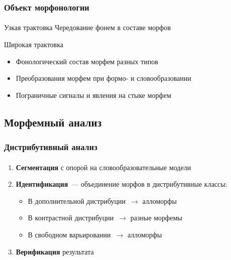 \begin{frame}
    \frametitle{Объект морфонологии}
    \framesubtitle{\autocite{les}}

    \begin{alertblock}{Узкая трактовка}
        Чередование фонем в составе морфов
    \end{alertblock}

    \begin{exampleblock}{Широкая трактовка}
        \begin{itemize}
            \item Фонологический состав морфем разных типов
            \item Преобразования морфем при формо- и словообразовании
            \item Пограничные сигналы и явления на стыке морфем
        \end{itemize}
    \end{exampleblock}
\end{frame}

\subsection{Морфемный анализ}


\begin{frame}
    \frametitle{Дистрибутивный анализ}
    \framesubtitle{\autocite[48--51]{apresyan:1966}}

    \begin{enumerate}
        \item \textbf{Сегментация} с опорой на словообразовательные модели
        \item \textbf{Идентификация}~--- объединение морфов в дистрибутивные классы: \begin{itemize}
            \item В дополнительной дистрибуции~$\rightarrow$ алломорфы
            \item В контрастной дистрибуции~$\rightarrow$ разные морфемы
            \item В свободном варьировании~$\rightarrow$ алломорфы
        \end{itemize}
        \item \textbf{Верификация} результата
    \end{enumerate}
\end{frame}


